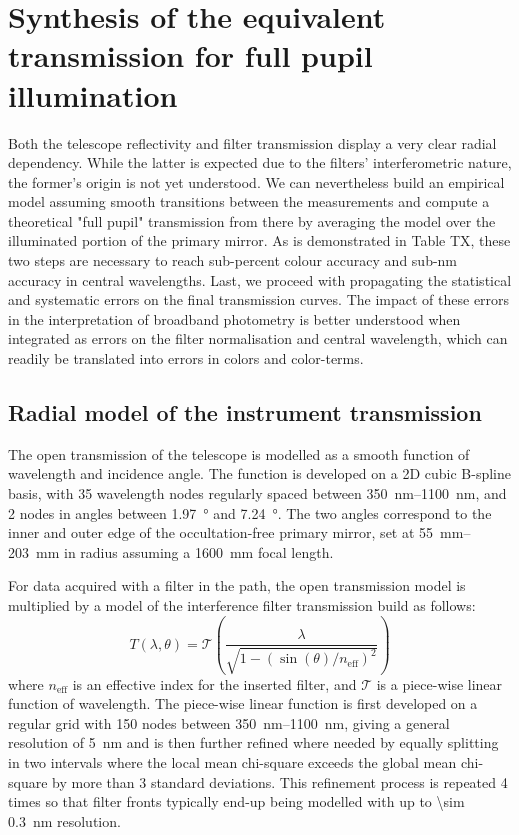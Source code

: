\section{Synthesis of the equivalent transmission for full pupil illumination}
\label{sec:pupil_stitching}

Both the telescope reflectivity and filter transmission display a very
clear radial dependency. While the latter is expected due to the
filters' interferometric nature, the former's origin is not
yet understood. We can nevertheless build an empirical model assuming
smooth transitions between the measurements and compute a
theoretical "full pupil" transmission from there by averaging the model over the
illuminated portion of the primary mirror. As is demonstrated in Table
TX, these two steps are necessary to reach sub-percent colour accuracy and sub-nm accuracy in central wavelengths. Last, we proceed
with propagating the statistical and systematic errors on the final
transmission curves. The impact of these errors in the interpretation
of broadband photometry is better understood when integrated as errors
on the filter normalisation and central wavelength, which can readily
be translated into errors in colors and color-terms.


\subsection{Radial model of the instrument transmission}
\label{sec:model}

The open transmission of the telescope is modelled as a smooth function
of wavelength and incidence angle. The function is developed on a 2D
cubic B-spline basis, with \num{35} wavelength nodes regularly spaced
between \SIrange{350}{1100}{nm}, and 2 nodes in angles between
\SI{1.97}{\degree} and \SI{7.24}{\degree}. The two angles correspond
to the inner and outer edge of the occultation-free primary mirror,
set at \SIrange{55}{203}{mm} in radius assuming a \SI{1600}{mm} focal
length.

For data acquired with a filter in the path, the open transmission
model is multiplied by a model of the interference filter transmission
build as follows:
\begin{equation}
  \label{eq:filtertransmission}
T(\lambda, \theta) = \mathcal T\left(\frac{\lambda}{\sqrt{1 -
    (\sin(\theta) / n_\text{eff})^2}}\right)
\end{equation}
where $n_\text{eff}$ is an effective index for the inserted filter,
and $\mathcal T$ is a piece-wise linear function of wavelength. The piece-wise linear function is first developed on a regular grid with
\num{150} nodes between \SIrange{350}{1100}{nm}, giving a general
resolution of \SI{5}{nm} and is then further refined where needed by
equally splitting in two intervals where the local mean chi-square
exceeds the global mean chi-square by more than $3$ standard
deviations. This refinement process is repeated \num{4} times so that
filter fronts typically end-up being modelled with up to \SI{\sim
  0.3}{nm} resolution.

